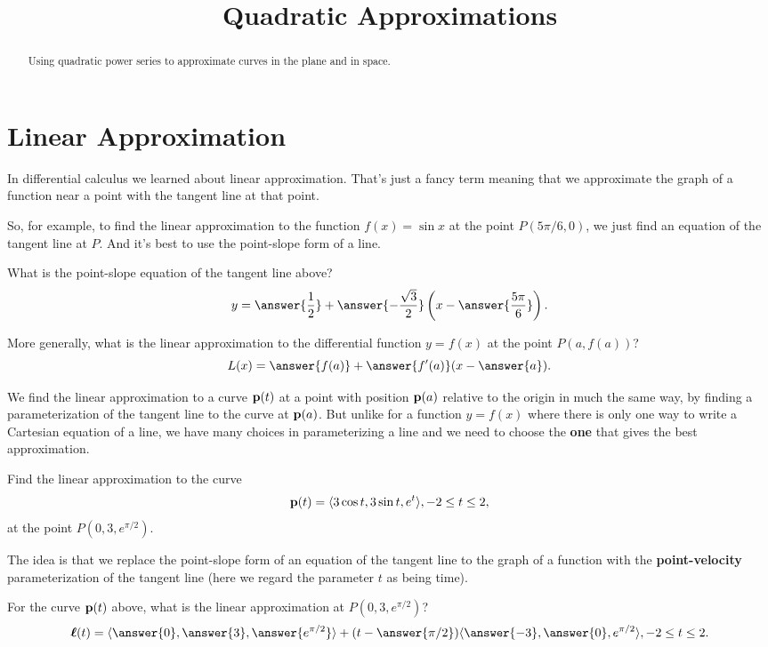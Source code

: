 \documentclass{ximera}
\title{Quadratic Approximations}
\begin{document}
\begin{abstract}
Using quadratic power series to approximate curves in the plane and in space.
\end{abstract}
\maketitle

\section{Linear Approximation}
In differential calculus we learned about linear approximation. That's just a fancy term meaning that we approximate the graph of a function near a point with the tangent line at that point.

So, for example, to find the linear approximation to the function $f(x) = \sin x$ at the point $P(5\pi/6,0)$, we just find an equation of the tangent line at $P$. And it's best to use the point-slope form of a line.

\begin{question}  \label{Qegbygyyu}
What is the point-slope equation of the tangent line above?
\[
    y = \answer{\frac{1}{2}} + \answer{-\frac{\sqrt{3}}{2}}\left( x - \answer{\frac{5\pi}{6}}  \right) .
\]
\end{question}

\begin{question}   \label{Qt43666}
More generally, what is the linear approximation to the differential function $y=f(x)$ at the point $P(a,f(a))$?
\[
     L(x) = \answer{f(a)} + \answer{f^\prime(a)} (x - \answer{a} ) .
\]
\end{question}


We find the linear approximation to a curve ${\bf p}(t)$ at a point with position ${\bf p}(a)$ relative to the origin in much the same way, by finding a parameterization of the tangent line to the curve at ${\bf p}(a)$. But unlike for a function $y=f(x)$ where there is only one way to write a Cartesian equation of a line, we have many choices in parameterizing a line and we need to choose the {\bf one} that gives the best approximation. 

\begin{question}   \label{Qggkuthds}
Find the linear approximation to the curve
\[
   {\bf p}(t) = \langle 3 \cos t, 3\sin t, e^t \rangle, -2\leq t \leq 2 ,
\]
at the point $P(0,3,e^{\pi/2})$.

The idea is that we replace the point-slope form of an equation of the tangent line to the graph of a function with the {\bf point-velocity} parameterization of the tangent line (here we regard the parameter $t$ as being time).

For the curve ${\bf p}(t)$ above, what is the linear approximation at $P(0,3,e^{\pi/2})$?
\[
   \boldsymbol{\ell}(t) = \langle  \answer{0}, \answer{3}  , \answer{e^{\pi/2}}  \rangle  + (t - \answer{\pi/2}) \langle \answer{-3}, \answer{0}, e^{\pi/2}  \rangle , -2\leq t \leq 2 .
\]


\end{question}
\end{document}
